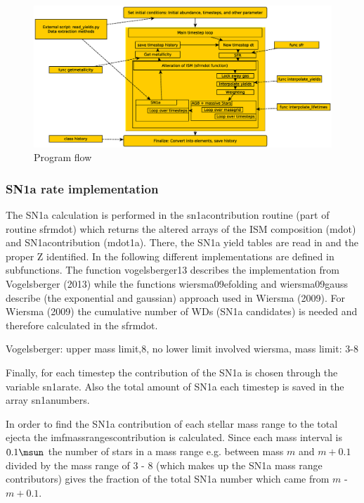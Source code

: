 \begin{figure}
\includegraphics[width=154mm]{figures/chart.eps}
\caption{Program flow}
\label{chart}
\end{figure}

\subsubsection{SN1a rate implementation}

The SN1a calculation is performed in the 
sn1a\textunderscore contribution routine (part of routine sfrmdot) which returns
the altered arrays of the ISM composition (mdot) and
SN1a\textunderscore contribution (mdot\textunderscore 1a).
There, the SN1a yield tables are read in and the proper
Z identified. In the following different implementations
are defined in subfunctions. The function vogelsberger13
describes the implementation from Vogelsberger (2013)
while the functions wiersma09\textunderscore efolding and wiersma09\textunderscore gauss
describe (the exponential and gaussian) approach used
in Wiersma (2009). For Wiersma (2009) the cumulative number
of WDs (SN1a candidates) is needed and therefore calculated
in the sfrmdot.
 
Vogelsberger: upper mass limit,8, no lower limit involved 
wiersma, mass limit:  3-8
 

Finally, for each timestep the contribution of the SN1a 
is chosen through the variable sn1a\textunderscore rate.
Also the total amount of SN1a each timestep is saved
in the array sn1a\textunderscore numbers.

In order to find the SN1a contribution of each stellar mass range to
the total ejecta the imfmass\textunderscore ranges\textunderscore contribution is calculated.
Since each mass interval is $0.1\msun$ the number of stars in
a mass range e.g. between mass $m$ and $m+0.1$ divided by the
mass range of $3$ - $8$ (which makes up the SN1a mass range contributors)
gives the fraction of the total SN1a number which came from
$m$ - $m+0.1$.


